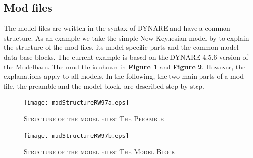 \subsection*{Mod files}
The model files are written in the syntax of DYNARE and have a common structure.
As an example we take the simple New-Keynesian model by \cite{RotembergWoodford1997} to
explain the structure of the mod-files, its model specific parts and the common model data base blocks. The current example is based on the DYNARE 4.5.6 version of the Modelbase. The mod-file is shown in {\bf Figure \ref{img:modStructureRW97a}} and {\bf Figure \ref{img:modStructureRW97b}}. However, the explanations apply to all models.
In the following, the two main parts of a mod-file, the preamble and the model block, are described step by step.

\begin{figure}[H]
\centering
\caption{\textsc{Structure of the model files: The Preamble}}
\vspace{0.2cm}
\texttt{[image: modStructureRW97a.eps]}\\
\label{img:modStructureRW97a}
\end{figure}

\begin{figure}[H]
\centering
\caption{\textsc{Structure of the model files: The Model Block}}
\vspace{0.2cm}
\texttt{[image: modStructureRW97b.eps]}\\
\label{img:modStructureRW97b}
\end{figure}

\vspace{2cm}


